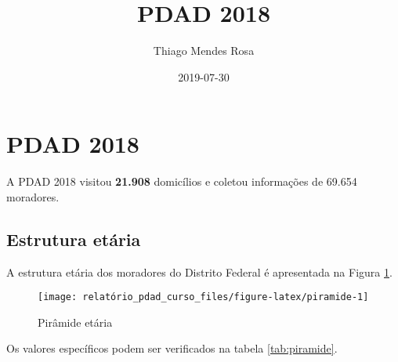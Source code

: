 \documentclass[]{article}
\title{PDAD 2018}
\author{Thiago Mendes Rosa}
\date{2019-07-30}
\begin{document}
\maketitle

\section{PDAD 2018}\label{pdad-2018}

A PDAD 2018 visitou \textbf{21.908} domicílios e coletou informações de
69.654 moradores.

\subsection{Estrutura etária}\label{estrutura-etaria}

A estrutura etária dos moradores do Distrito Federal é apresentada na
Figura \ref{fig:piramide}.

\begin{figure}[H]
\texttt{[image: relatório\_pdad\_curso\_files/figure-latex/piramide-1]} \caption{Pirâmide etária \label{fig:piramide}}\label{fig:piramide}
\end{figure}

Os valores específicos podem ser verificados na tabela
\ref{tab:piramide}.
\end{document}
